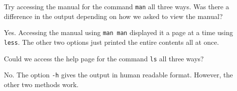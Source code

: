 \begin{questions}
Try accessing the manual for the command \texttt{man} all three ways. 
Was there a difference in the output depending on how we asked to view the manual?\\
\begin{answer}
Yes.
Accessing the manual using \texttt{man man} displayed it a page at a time using \texttt{less}.
The other two options just printed the entire contents all at once.\\
\end{answer}


Could we access the help page for the command \texttt{ls} all three ways? \\
\begin{answer}
No.
The option \texttt{-h} gives the output in human readable format.
However, the other two methods work.\\
\end{answer}
\end{questions}

